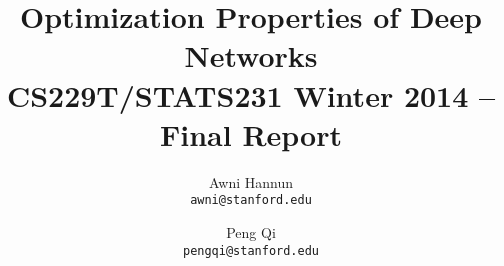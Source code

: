 \documentclass[11pt,english]{article}
\title{ Optimization Properties of Deep Networks \\
{\large CS229T/STATS231 Winter 2014 -- Final Report }
}
\author{ \large
Awni Hannun \\
\texttt{awni@stanford.edu}
\and
Peng Qi \\
\texttt{pengqi@stanford.edu}
}
\date{}
\newcommand{\1}{\mathbb{I}} %
\begin{document}
\maketitle
\begin{multicols}{2}







{}

\end{multicols}
\end{document}
